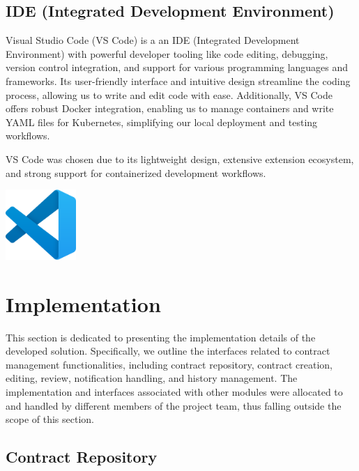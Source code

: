 \subsection{IDE (Integrated Development Environment)}
Visual Studio Code (VS Code) is a an IDE (Integrated Development Environment) with powerful developer tooling like code editing, debugging, version control integration, and support for various programming languages and frameworks. Its user-friendly interface and intuitive design streamline the coding process, allowing us to write and edit code with ease. Additionally, VS Code offers robust Docker integration, enabling us to manage containers and write YAML files for Kubernetes, simplifying our local deployment and testing workflows.\mynewline

VS Code was chosen due to its lightweight design, extensive extension ecosystem, and strong support for containerized development workflows.

\begin{center}
    \centering
    \includegraphics[width=0.2\textwidth]{Images/VS Code Logo.png}
     \cite{vscode_logo}
    \label{fig:vscode_logo}
\end{center}

\section{Implementation}
This section is dedicated to presenting the implementation details of the developed solution. Specifically, we outline the interfaces related to contract management functionalities, including contract repository, contract creation, editing, review, notification handling, and history management. The implementation and interfaces associated with other modules were allocated to and handled by different members of the project team, thus falling outside the scope of this section.

\subsection{Contract Repository}

